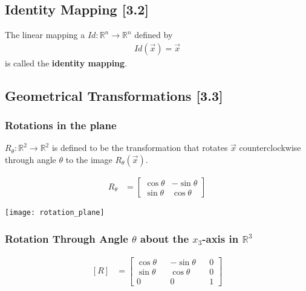 \documentclass[a4paper,9pt]{extarticle}
\begin{document}
\begin{multicols*}{2}
\subsection{Identity Mapping [3.2]}
The linear mapping a $Id: \mathbb{R}^n \to \mathbb{R}^n$ defined by
\begin{equation} \label{3.2-5}
    \begin{split}
        Id(\vec{x}) = \vec{x}
    \end{split}
\end{equation}
is called the \textbf{identity mapping}.


\subsection{Geometrical Transformations [3.3]}

\subsubsection{Rotations in the plane}
$R_{\theta} : \mathbb{R}^2 \to \mathbb{R}^2$ is defined to be the transformation that rotates $\vec{x}$ counterclockwise through angle $\theta$ to the image $R_{\theta}(\vec{x})$.

\begin{equation} \label{3.3-1}
    \begin{split}
        R_{\theta} & = \begin{bmatrix}
            \cos{\theta} & - \sin{\theta} \\ \sin{\theta} & \cos{\theta}
        \end{bmatrix}
    \end{split}
\end{equation}

{\centering \texttt{[image: rotation\_plane]} \par}


\subsubsection{Rotation Through Angle $\theta$ about the $x_3$-axis in $\mathbb{R}^3$}
\begin{equation} \label{3.3-3}
    \begin{split}
        [R] & = \begin{bmatrix}\cos{\theta} && -\sin{\theta} && 0 \\ \sin{\theta} && \cos{\theta} && 0 \\ 0 && 0 && 1\end{bmatrix}
    \end{split}
\end{equation}


\end{multicols*}
\end{document}
